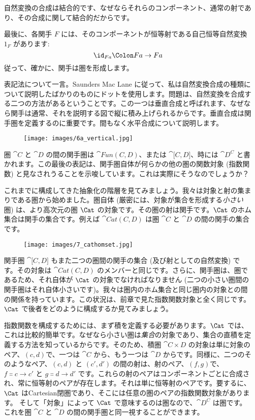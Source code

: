 \noindent
自然変換の合成は結合的です、なぜならそれらのコンポーネント、通常の射であり、その合成に関して結合的だからです。

最後に、各関手 $F$ には、そのコンポーネントが恒等射である自己恒等自然変換 $1_F$ があります: 
\[\id_{F a} \Colon F a \to F a\]
従って、確かに、関手は圏を形成します。

表記法について一言。Saunders Mac Lane に従って、私は自然変換合成の種類について説明したばかりのものにドットを使用します。問題は、自然変換を合成する二つの方法があるということです。この一つは垂直合成と呼ばれます、なぜなら関手は通常、それを説明する図で縦に積み上げられるからです。垂直合成は関手圏を定義するのに重要です。間もなく水平合成について説明します。

\begin{figure}[H]
  \centering
  \texttt{[image: images/6a\_vertical.jpg]}
\end{figure}

\noindent
圏 $\cat{C}$ と $\cat{D}$ の間の関手圏は $\cat{Fun(C, D)}$、または $\cat{{[}C, D{]}}$、時には $\cat{D^C}$ と書かれます。この最後の表記は、関手圏自体が何らかの他の圏の関数対象 (指数関数) と見なされうることを示唆しています。これは実際にそうなのでしょうか？

これまでに構成してきた抽象化の階層を見てみましょう。我々は対象と射の集まりである圏から始めました。圏自体 (厳密には、対象が集合を形成する\emph{小さい}圏) は、より高次元の圏 $\Cat$ の対象です。その圏の射は関手です。$\Cat$ のホム集合は関手の集合です。例えば $\cat{Cat(C, D)}$ は圏 $\cat{C}$ と $\cat{D}$ の間の関手の集合です。

\begin{figure}[H]
  \centering
  \texttt{[image: images/7\_cathomset.jpg]}
\end{figure}

\noindent
関手圏 $\cat{{[}C, D{]}}$ もまた二つの圏間の関手の集合 (及び射としての自然変換) です。その対象は $\cat{Cat(C, D)}$ のメンバーと同じです。さらに、関手圏は、圏であるため、それ自体が $\Cat$ の対象でなければなりません (二つの小さい圏間の関手圏はそれ自体小さいです)。我々は圏内のホム集合と同じ圏内の対象との間の関係を持っています。この状況は、前章で見た指数関数対象と全く同じです。$\Cat$ で後者をどのように構成するか見てみましょう。

指数関数を構成するためには、まず積を定義する必要があります。$\Cat$ では、これは比較的簡単です。なぜなら小さい圏は\emph{集合}の対象であり、集合の直積を定義する方法を知っているからです。そのため、積圏 $\cat{C\times D}$ の対象は単に対象のペア、$(c, d)$で、一つは $\cat{C}$ から、もう一つは $\cat{D}$ からです。同様に、二つのそのようなペア、$(c, d)$ と $(c', d')$ の間の射は、射のペア、$(f, g)$で、$f \Colon c \to c'$ と $g \Colon d \to d'$ です。これらの射のペアはコンポーネントごとに合成され、常に恒等射のペアが存在します。それは単に恒等射のペアです。要するに、$\Cat$ はCartesian閉圏であり、そこには任意の圏のペアの指数関数対象があります。
そして「対象」によって $\Cat$ で意味するのは圏なので、$\cat{D^C}$ は圏です。これを圏 $\cat{C}$ と $\cat{D}$ の間の関手圏と同一視することができます。

